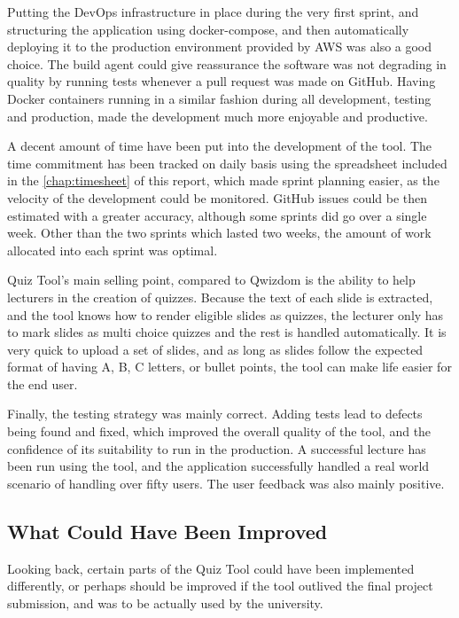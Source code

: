 Putting the DevOps infrastructure in place during the very first sprint, and structuring
the application using docker-compose, and then automatically deploying it to the
production environment provided by AWS was also a good choice. The build agent
could give reassurance the software was not degrading in quality by running tests
whenever a pull request was made on GitHub. Having Docker containers running in a
similar fashion during all development, testing and production, made the development
much more enjoyable and productive.

A decent amount of time have been put into the development of the tool. The time
commitment has been tracked on daily basis using the spreadsheet included in the
\autoref{chap:timesheet} of this report, which
made sprint planning easier, as the velocity of the development could be monitored.
GitHub issues could be then estimated with a greater accuracy, although some
sprints did go over a single week. Other than the two sprints which lasted two weeks,
the amount of work allocated into each sprint was optimal.

Quiz Tool's main selling point, compared to Qwizdom is the ability to help lecturers
in the creation of quizzes. Because the text of each slide is extracted, and the tool
knows how to render eligible slides as quizzes, the lecturer only has to mark
slides as multi choice quizzes and the rest is handled automatically. It is very quick
to upload a set of slides, and as long as slides follow the expected format of having
A, B, C letters, or bullet points, the tool can make life easier for the end user.

Finally, the testing strategy was mainly correct. Adding tests lead to defects being
found and fixed, which improved the overall quality of the tool, and the confidence
of its suitability to run in the production. A successful lecture has been run using
the tool, and the application successfully handled a real world scenario of handling
over fifty users. The user feedback was also mainly positive.

\subsection{What Could Have Been Improved}
Looking back, certain parts of the Quiz Tool could have been implemented differently,
or perhaps should be improved if the tool outlived the final project submission, and was
to be actually used by the university.

